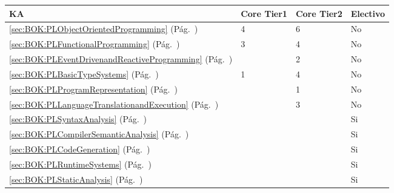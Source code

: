\begin{center}
\begin{tabularx}{\textwidth}{|X|p{1cm}|p{1cm}|p{1.4cm}|}\hline
\textbf{\acf{KA}} & \textbf{Core Tier1} & \textbf{Core Tier2} & \textbf{Electivo} \\ \hline
\ref{sec:BOK:PLObjectOrientedProgramming} \htmlref{\PLObjectOrientedProgramming}{sec:BOK:PLObjectOrientedProgramming}\xspace (Pág.~\pageref{sec:BOK:PLObjectOrientedProgramming}) & 4 & 6 & No \\ \hline
\ref{sec:BOK:PLFunctionalProgramming} \htmlref{\PLFunctionalProgramming}{sec:BOK:PLFunctionalProgramming}\xspace (Pág.~\pageref{sec:BOK:PLFunctionalProgramming}) & 3 & 4 & No \\ \hline
\ref{sec:BOK:PLEventDrivenandReactiveProgramming} \htmlref{\PLEventDrivenandReactiveProgramming}{sec:BOK:PLEventDrivenandReactiveProgramming}\xspace (Pág.~\pageref{sec:BOK:PLEventDrivenandReactiveProgramming}) & ~ & 2 & No \\ \hline
\ref{sec:BOK:PLBasicTypeSystems} \htmlref{\PLBasicTypeSystems}{sec:BOK:PLBasicTypeSystems}\xspace (Pág.~\pageref{sec:BOK:PLBasicTypeSystems}) & 1 & 4 & No \\ \hline
\ref{sec:BOK:PLProgramRepresentation} \htmlref{\PLProgramRepresentation}{sec:BOK:PLProgramRepresentation}\xspace (Pág.~\pageref{sec:BOK:PLProgramRepresentation}) & ~ & 1 & No \\ \hline
\ref{sec:BOK:PLLanguageTranslationandExecution} \htmlref{\PLLanguageTranslationandExecution}{sec:BOK:PLLanguageTranslationandExecution}\xspace (Pág.~\pageref{sec:BOK:PLLanguageTranslationandExecution}) & ~ & 3 & No \\ \hline
\ref{sec:BOK:PLSyntaxAnalysis} \htmlref{\PLSyntaxAnalysis}{sec:BOK:PLSyntaxAnalysis}\xspace (Pág.~\pageref{sec:BOK:PLSyntaxAnalysis}) & ~ & ~ & Si \\ \hline
\ref{sec:BOK:PLCompilerSemanticAnalysis} \htmlref{\PLCompilerSemanticAnalysis}{sec:BOK:PLCompilerSemanticAnalysis}\xspace (Pág.~\pageref{sec:BOK:PLCompilerSemanticAnalysis}) & ~ & ~ & Si \\ \hline
\ref{sec:BOK:PLCodeGeneration} \htmlref{\PLCodeGeneration}{sec:BOK:PLCodeGeneration}\xspace (Pág.~\pageref{sec:BOK:PLCodeGeneration}) & ~ & ~ & Si \\ \hline
\ref{sec:BOK:PLRuntimeSystems} \htmlref{\PLRuntimeSystems}{sec:BOK:PLRuntimeSystems}\xspace (Pág.~\pageref{sec:BOK:PLRuntimeSystems}) & ~ & ~ & Si \\ \hline
\ref{sec:BOK:PLStaticAnalysis} \htmlref{\PLStaticAnalysis}{sec:BOK:PLStaticAnalysis}\xspace (Pág.~\pageref{sec:BOK:PLStaticAnalysis}) & ~ & ~ & Si \\ \hline

\end{tabularx}
\end{center}
